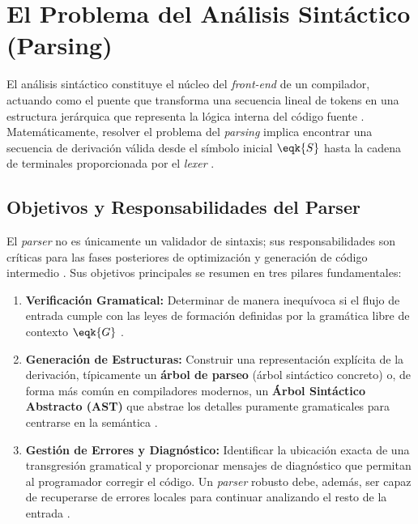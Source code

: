 \section{El Problema del Análisis Sintáctico (Parsing)}
\label{sec:3_4_parsing}

El análisis sintáctico constituye el núcleo del \textit{front-end} de un compilador, actuando como el puente que transforma una secuencia lineal de tokens en una estructura jerárquica que representa la lógica interna del código fuente \cite{aho2006compilers}. Matemáticamente, resolver el problema del \textit{parsing} implica encontrar una secuencia de derivación válida desde el símbolo inicial $\eqk{S}$ hasta la cadena de terminales proporcionada por el \textit{lexer} \cite{sipser2012introduction}.

\subsection{Objetivos y Responsabilidades del Parser}
\label{subsec:3_4_1_objetivos}

El \textit{parser} no es únicamente un validador de sintaxis; sus responsabilidades son críticas para las fases posteriores de optimización y generación de código intermedio \cite{aho2006compilers}. Sus objetivos principales se resumen en tres pilares fundamentales:

\begin{enumerate}
    \item \textbf{Verificación Gramatical:} Determinar de manera inequívoca si el flujo de entrada cumple con las leyes de formación definidas por la gramática libre de contexto $\eqk{G}$ \cite{sipser2012introduction, aho2006compilers}.
    \item \textbf{Generación de Estructuras:} Construir una representación explícita de la derivación, típicamente un \textbf{árbol de parseo} (árbol sintáctico concreto) o, de forma más común en compiladores modernos, un \textbf{Árbol Sintáctico Abstracto (AST)} que abstrae los detalles puramente gramaticales para centrarse en la semántica \cite{aho2006compilers}.
    \item \textbf{Gestión de Errores y Diagnóstico:} Identificar la ubicación exacta de una transgresión gramatical y proporcionar mensajes de diagnóstico que permitan al programador corregir el código. Un \textit{parser} robusto debe, además, ser capaz de recuperarse de errores locales para continuar analizando el resto de la entrada \cite{aho2006compilers}.
\end{enumerate}

